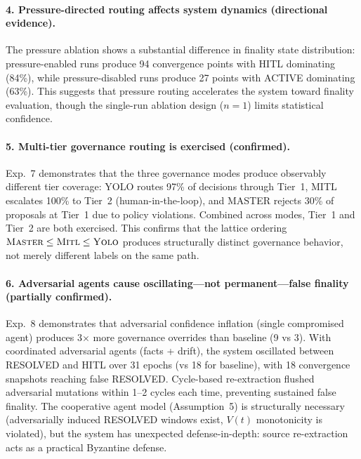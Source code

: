 \documentclass[11pt]{article}
\begin{document}
\paragraph{4. Pressure-directed routing affects system dynamics (directional evidence).} The pressure ablation shows a substantial difference in finality state distribution: pressure-enabled runs produce 94 convergence points with HITL dominating (84\%), while pressure-disabled runs produce 27 points with ACTIVE dominating (63\%). This suggests that pressure routing accelerates the system toward finality evaluation, though the single-run ablation design ($n = 1$) limits statistical confidence.

\paragraph{5. Multi-tier governance routing is exercised (confirmed).} Exp.~7 demonstrates that the three governance modes produce observably different tier coverage: YOLO routes 97\% of decisions through Tier~1, MITL escalates 100\% to Tier~2 (human-in-the-loop), and MASTER rejects 30\% of proposals at Tier~1 due to policy violations. Combined across modes, Tier~1 and Tier~2 are both exercised. This confirms that the lattice ordering $\textsc{Master} \leq \textsc{Mitl} \leq \textsc{Yolo}$ produces structurally distinct governance behavior, not merely different labels on the same path.

\paragraph{6. Adversarial agents cause oscillating---not permanent---false finality (partially confirmed).} Exp.~8 demonstrates that adversarial confidence inflation (single compromised agent) produces 3$\times$ more governance overrides than baseline (9 vs 3). With coordinated adversarial agents (facts + drift), the system oscillated between RESOLVED and HITL over 31 epochs (vs 18 for baseline), with 18 convergence snapshots reaching false RESOLVED. Cycle-based re-extraction flushed adversarial mutations within 1--2 cycles each time, preventing sustained false finality. The cooperative agent model (Assumption~5) is structurally necessary (adversarially induced RESOLVED windows exist, $V(t)$ monotonicity is violated), but the system has unexpected defense-in-depth: source re-extraction acts as a practical Byzantine defense.
\end{document}

